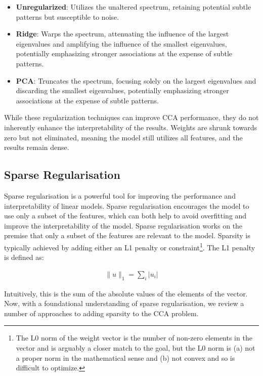 \begin{itemize}
    \item \textbf{Unregularized}: Utilizes the unaltered spectrum, retaining potential subtle patterns but susceptible to noise.
    \item \textbf{Ridge}: Warps the spectrum, attenuating the influence of the largest eigenvalues and amplifying the influence of the smallest eigenvalues, potentially emphasizing stronger associations at the expense of subtle patterns.
    \item \textbf{PCA}: Truncates the spectrum, focusing solely on the largest eigenvalues and discarding the smallest eigenvalues, potentially emphasizing stronger associations at the expense of subtle patterns.
\end{itemize}

While these regularization techniques can improve CCA performance, they do not inherently enhance the interpretability of the results.
Weights are shrunk towards zero but not eliminated, meaning the model still utilizes all features, and the results remain dense.

\subsection{Sparse Regularisation}

Sparse regularisation is a powerful tool for improving the performance and interpretability of linear models.
Sparse regularisation encourages the model to use only a subset of the features, which can both help to avoid overfitting and improve the interpretability of the model.
Sparse regularisation works on the premise that only a subset of the features are relevant to the model.
Sparsity is typically achieved by adding either an L1 penalty or constraint\footnote{The L0 norm of the weight vector is the number of non-zero elements in the vector and is arguably a closer match to the goal, but the L0 norm is (a) not a proper norm in the mathematical sense and (b) not convex and so is difficult to optimize.}.
The L1 penalty is defined as:

\begin{align}
    \|u\|_1 = \sum_i |u_i|
\end{align}

Intuitively, this is the sum of the absolute values of the elements of the vector.
Now, with a foundational understanding of sparse regularisation, we review a number of approaches to adding sparsity to the CCA problem.

